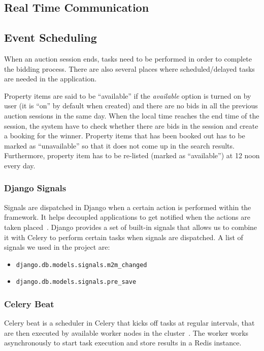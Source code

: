 \subsection{Real Time Communication}
\subsection{Event Scheduling}
When an auction session ends, tasks need to be performed in order to complete
the bidding process. There are also several places where scheduled/delayed tasks
are needed in the application.

Property items are said to be ``available'' if the \emph{available} option is
turned on by user (it is ``on'' by default when created) and there are no bids
in all the previous auction sessions in the same day. When the local time
reaches the end time of the session, the system have to check whether there are
bids in the session and create a booking for the winner. Property items that has
been booked out has to be marked as ``unavailable'' so that it does not come up
in the search results. Furthermore, property item has to be re-listed (marked
as ``available'') at 12 noon every day.

\subsubsection{Django Signals}
Signals are dispatched in Django when a certain action is performed within the
framework. It helps decoupled applications to get notified when the actions are
taken placed~\cite{django-signals}. Django provides a set of built-in signals
that allows us to combine it with Celery to perform certain tasks when signals
are dispatched. A list of signals we used in the project are:

\begin{itemize}
  \item \texttt{django.db.models.signals.m2m\_changed}
  \item \texttt{django.db.models.signals.pre\_save}
\end{itemize}

\subsubsection{Celery Beat}
Celery beat is a scheduler in Celery that kicks off tasks at regular intervals,
that are then executed by available worker nodes in the cluster~\cite{celery-beat}.
The worker works asynchronously to start task execution and store results in
a Redis instance.

